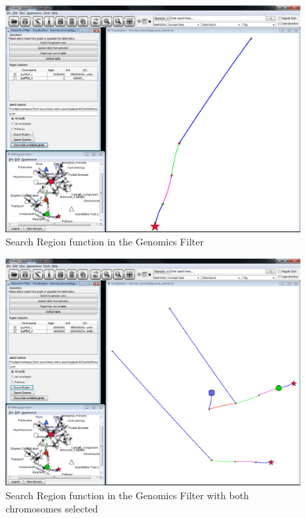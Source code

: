 \begin{figure}[H]
\centering
\includegraphics[scale=0.35]{images/Oct12/poplarkb_search_region.png} 
\caption{Search Region function in the Genomics Filter}
\label{fig:poplarkb_search_region}
\end{figure}

\begin{figure}[H]
\centering
\includegraphics[scale=0.35]{images/Oct12/poplarkb_search_region_2.png} 
\caption{Search Region function in the Genomics Filter with both chromosomes selected}
\label{fig:poplarkb_search_region_2}
\end{figure}


